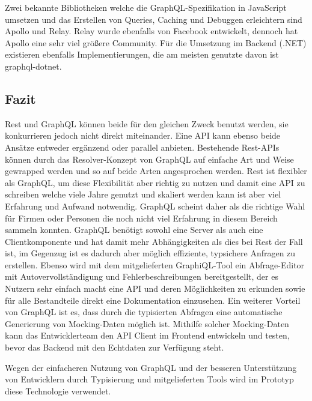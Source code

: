 Zwei bekannte Bibliotheken welche die GraphQL-Spezifikation in JavaScript umsetzen und das Erstellen von Queries, Caching und Debuggen erleichtern sind Apollo und Relay. Relay wurde ebenfalls von Facebook entwickelt, dennoch hat Apollo eine sehr viel größere Community. Für die Umsetzung im Backend (.NET) existieren ebenfalls Implementierungen, die am meisten genutzte davon ist graphql-dotnet.

\subsection{Fazit}

Rest und GraphQL können beide für den gleichen Zweck benutzt werden, sie konkurrieren jedoch nicht direkt miteinander. Eine API kann ebenso beide Ansätze entweder ergänzend oder parallel anbieten. Bestehende Rest-APIs können durch das Resolver-Konzept von GraphQL auf einfache Art und Weise gewrapped werden und so auf beide Arten angesprochen werden. Rest ist flexibler als GraphQL, um diese Flexibilität aber richtig zu nutzen und damit eine API zu schreiben welche viele Jahre genutzt und skaliert werden kann ist aber viel Erfahrung und Aufwand notwendig. GraphQL scheint daher als die richtige Wahl für Firmen oder Personen die noch nicht viel Erfahrung in diesem Bereich sammeln konnten. GraphQL benötigt sowohl eine Server als auch eine Clientkomponente und hat damit mehr Abhängigkeiten als dies bei Rest der Fall ist, im Gegenzug ist es dadurch aber möglich effiziente, typsichere Anfragen zu erstellen. Ebenso wird mit dem mitgelieferten GraphiQL-Tool ein Abfrage-Editor mit Autovervollständigung und Fehlerbeschreibungen bereitgestellt, der es Nutzern sehr einfach macht eine API und deren Möglichkeiten zu erkunden sowie für alle Bestandteile direkt eine Dokumentation einzusehen. Ein weiterer Vorteil von GraphQL ist es, dass durch die typisierten Abfragen eine automatische Generierung von Mocking-Daten möglich ist. Mithilfe solcher Mocking-Daten kann das Entwicklerteam den API Client im Frontend entwickeln und testen, bevor das Backend mit den Echtdaten zur Verfügung steht.

Wegen der einfacheren Nutzung von GraphQL und der besseren Unterstützung von Entwicklern durch Typisierung und mitgelieferten Tools wird im Prototyp diese Technologie verwendet.
